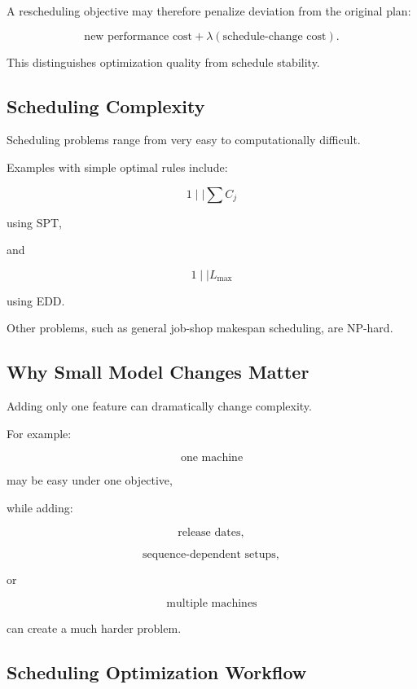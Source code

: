 A rescheduling objective may therefore penalize deviation from the original
plan:

\[
\boxed{
\text{new performance cost}
+
\lambda
(
\text{schedule-change cost}
).
}
\]

This distinguishes optimization quality from schedule stability.

\subsection{Scheduling Complexity}
\label{subsec:scheduling-complexity}

Scheduling problems range from very easy to computationally difficult.

Examples with simple optimal rules include:

\[
\boxed{
1\mid\mid\sum C_j
}
\]

using SPT,

and

\[
\boxed{
1\mid\mid L_{\max}
}
\]

using EDD.

Other problems, such as general job-shop makespan scheduling, are NP-hard.

\subsection{Why Small Model Changes Matter}
\label{subsec:scheduling-small-model-changes}

Adding only one feature can dramatically change complexity.

For example:

\[
\boxed{
\text{one machine}
}
\]

may be easy under one objective,

while adding:

\[
\boxed{
\text{release dates},
}
\]

\[
\boxed{
\text{sequence-dependent setups},
}
\]

or

\[
\boxed{
\text{multiple machines}
}
\]

can create a much harder problem.

\subsection{Scheduling Optimization Workflow}
\label{subsec:scheduling-workflow}

